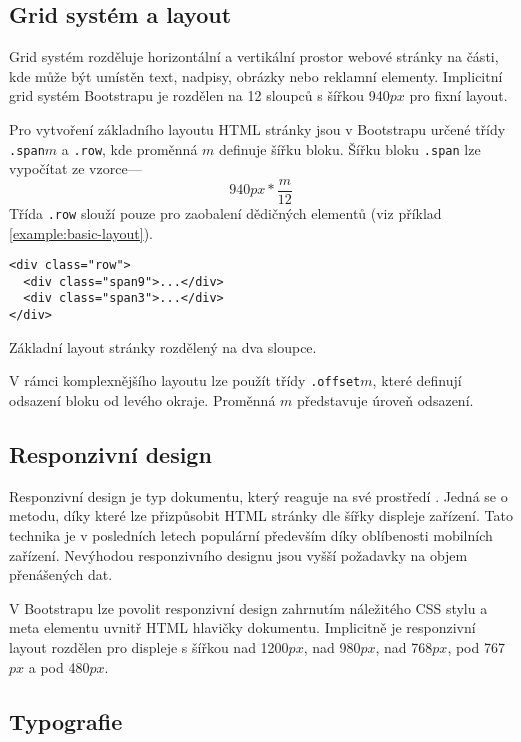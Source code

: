 \subsection{Grid systém a layout}

Grid systém rozděluje horizontální a vertikální prostor webové stránky na části, kde může být umístěn text, nadpisy, obrázky nebo reklamní elementy. Implicitní grid systém Bootstrapu je rozdělen na 12 sloupců s šířkou 940$px$ pro fixní layout.

Pro vytvoření základního layoutu HTML stránky jsou v Bootstrapu určené třídy \texttt{.span}$m$ a \texttt{.row}, kde proměnná $m$ definuje šířku bloku. Šířku bloku \texttt{.span} lze vypočítat ze vzorce---
$$940px * \frac{m}{12}$$
Třída \texttt{.row} slouží pouze pro zaobalení dědičných elementů (viz příklad \ref{example:basic-layout}).

\begin{example}
    \centering
    \begin{lstlisting}
<div class="row">
  <div class="span9">...</div>
  <div class="span3">...</div>
</div>
    \end{lstlisting}
    \caption{Základní layout stránky rozdělený na dva sloupce.}
    \label{example:basic-layout}
\end{example}

V rámci komplexnějšího layoutu lze použít třídy \texttt{.offset}$m$, které definují odsazení bloku od levého okraje. Proměnná $m$ představuje úroveň odsazení.

\subsection{Responzivní design}

Responzivní design je typ dokumentu, který reaguje na své prostředí \cite{responsive-design}. Jedná se o metodu, díky které lze přizpůsobit HTML stránky dle šířky displeje zařízení. Tato technika je v posledních letech populární především díky oblíbenosti mobilních zařízení. Nevýhodou responzivního designu jsou vyšší požadavky na objem přenášených dat.

V Bootstrapu lze povolit responzivní design zahrnutím náležitého CSS stylu a meta elementu uvnitř HTML hlavičky dokumentu. Implicitně je responzivní layout rozdělen pro displeje s šířkou nad 1200$px$, nad 980$px$, nad 768$px$, pod 767$px$ a pod 480$px$.

\subsection{Typografie}

